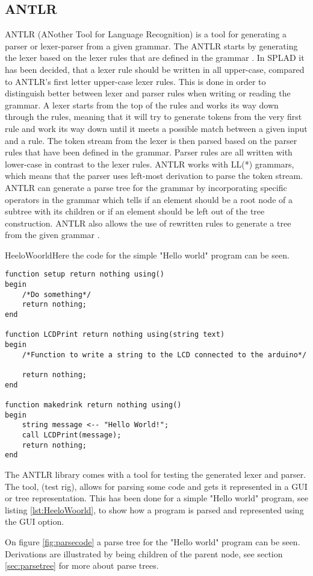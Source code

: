 \subsection{ANTLR}
ANTLR (ANother Tool for Language Recognition) is a tool for generating a parser or lexer-parser from a given grammar. The ANTLR starts by generating the lexer based on the lexer rules that are defined in the grammar \citep{ANTLRLexer}. In SPLAD it has been decided, that a lexer rule should be written in all upper-case, compared to ANTLR's first letter upper-case lexer rules. This is done in order to distinguish better between lexer and parser rules when writing or reading the grammar. A lexer starts from the top of the rules and works its way down through the rules, meaning that it will try to generate tokens from the very first rule and work its way down until it meets a possible match between a given input and a rule. 
The token stream from the lexer is then parsed based on the parser rules that have been defined in the grammar. Parser rules are all written with lower-case in contrast to the lexer rules. ANTLR works with LL(*) grammars, which means that the parser uses left-most derivation to parse the token stream. ANTLR can generate a parse tree for the grammar by incorporating specific operators in the grammar which tells if an element should be a root node of a subtree with its children or if an element should be left out of the tree construction. ANTLR also allows the use of rewritten rules to generate a tree from the given grammar \citep{ANTLRTreeCon}.

\begin{code}{HeeloWoorld}{Here the code for the simple "Hello world" program can be seen.}
\begin{lstlisting}
function setup return nothing using()
begin
	/*Do something*/
	return nothing;
end

function LCDPrint return nothing using(string text)
begin
	/*Function to write a string to the LCD connected to the arduino*/
		
	return nothing;
end

function makedrink return nothing using()
begin
	string message <-- "Hello World!";
	call LCDPrint(message);
	return nothing;
end
\end{lstlisting}
\end{code}

The ANTLR library comes with a tool for testing the generated lexer and parser. The tool, (test rig), allows for parsing some code and gets it represented
in a GUI or tree representation. This has been done for a simple "Hello world" program, see listing \ref{lst:HeeloWoorld}, to show how a program is parsed and represented using the GUI option.


On figure \ref{fig:parsecode} a parse tree for the "Hello world" program can be seen. Derivations are illustrated by being children of the parent node, see section \ref{sec:parsetree} for more about parse trees.